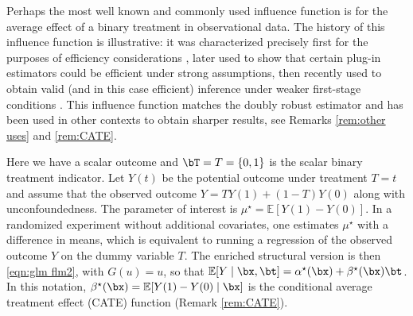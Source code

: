 \documentclass[12pt]{article}
\numberwithin{equation}{section}
\theoremstyle{definition}
\newcommand{\E}{\mathbb{E}}
\newcommand{\mtrue}{\mu^\star}
\newcommand{\atrue}{\alpha^\star}
\newcommand{\btrue}{\beta^\star}
\begin{document}
\begin{appendices}
Perhaps the most well known and commonly used influence function is for the average effect of a binary treatment in observational data. The history of this influence function is illustrative: it was characterized precisely first for the purposes of efficiency considerations \citep{Hahn1998_Ecma}, later used to show that certain plug-in estimators could be efficient \citep{Hirano-Imbens-Ridder2003_Ecma,Imbens-Newey-Ridder2007_MSE,Cattaneo-Farrell2011_chapter} under strong assumptions, then recently used to obtain valid (and in this case efficient) inference under weaker first-stage conditions \citep{Cattaneo2010_JoE,Farrell2015_arXiv}. This influence function matches the doubly robust estimator \citep{Robins-Rotnitzky-Zhao1994_JASA,Robins-Rotnitzky-Zhao1995_JASA} and has been used in other contexts to obtain sharper results, see Remarks \ref{rem:other uses} and \ref{rem:CATE}.

Here we have a scalar outcome and $\bT = T = \{0,1\}$ is the scalar binary treatment indicator. Let $Y(t)$ be the potential outcome under treatment $T = t$ and assume that the observed outcome $Y = T Y(1) + (1-T) Y(0)$ along with unconfoundedness. The parameter of interest is $\mtrue = \E[Y(1) - Y(0)]$. In a randomized experiment without additional covariates, one estimates $\mtrue$ with a difference in means, which is equivalent to running a regression of the observed outcome $Y$ on the dummy variable $T$. The enriched structural version is then \eqref{eqn:glm flm2}, with $G(u) = u$, so that $\E[Y \mid \bx, \bt] = \atrue(\bx) + \btrue(\bx) \bt$. In this notation, $\btrue(\bx) = \E[Y(1) - Y(0) \mid \bx]$ is the conditional average treatment effect (CATE) function (Remark \ref{rem:CATE}). 


\end{appendices}
\end{document}
